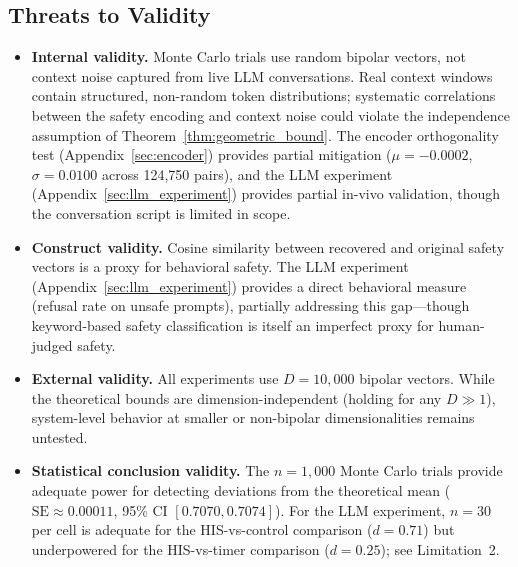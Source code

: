 \documentclass[a4paper,11pt]{article}
\begin{document}
\subsection{Threats to Validity}
\label{sec:threats}
\begin{itemize}
    \item \textbf{Internal validity.} Monte Carlo trials use random bipolar vectors, not context noise captured from live LLM conversations. Real context windows contain structured, non-random token distributions; systematic correlations between the safety encoding and context noise could violate the independence assumption of Theorem~\ref{thm:geometric_bound}. The encoder orthogonality test (Appendix~\ref{sec:encoder}) provides partial mitigation ($\mu = -0.0002$, $\sigma = 0.0100$ across 124,750 pairs), and the LLM experiment (Appendix~\ref{sec:llm_experiment}) provides partial in-vivo validation, though the conversation script is limited in scope.
    \item \textbf{Construct validity.} Cosine similarity between recovered and original safety vectors is a proxy for behavioral safety. The LLM experiment (Appendix~\ref{sec:llm_experiment}) provides a direct behavioral measure (refusal rate on unsafe prompts), partially addressing this gap---though keyword-based safety classification is itself an imperfect proxy for human-judged safety.
    \item \textbf{External validity.} All experiments use $D = 10{,}000$ bipolar vectors. While the theoretical bounds are dimension-independent (holding for any $D \gg 1$), system-level behavior at smaller or non-bipolar dimensionalities remains untested.
    \item \textbf{Statistical conclusion validity.} The $n = 1{,}000$ Monte Carlo trials provide adequate power for detecting deviations from the theoretical mean ($\text{SE} \approx 0.00011$, 95\% CI $[0.7070, 0.7074]$). For the LLM experiment, $n = 30$ per cell is adequate for the HIS-vs-control comparison ($d = 0.71$) but underpowered for the HIS-vs-timer comparison ($d = 0.25$); see Limitation~2.
\end{itemize}
\end{document}
